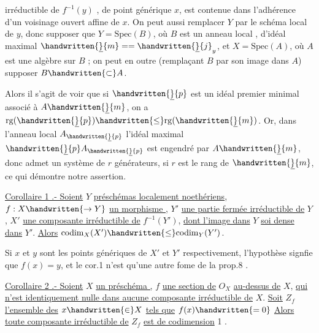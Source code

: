 irréductible de $f^{-1}(y)$ , de point générique $x$, est contenue dans l'adhérence d'un voisinage ouvert affine de $x$. On peut aussi remplacer $Y$ par le schéma local de $y$, donc supposer que  $Y=\mathrm{Spec}(B)$, où $B$ est un anneau local , d'idéal maximal $\handwritten{\underline}{m}==\handwritten{\underline}{j}_y$, et $X=\mathrm{Spec}(A)$, où $A$ est une algèbre   sur $B$ ; on peut en outre (remplaçant $B$ par son image dans $A$) supposer $B\handwritten{\subset} A$.

Alors il s'agit de voir que si $\handwritten{\underline}{p}$ est  un idéal premier minimal associé à $A\handwritten{\underline}{m}$, on a $\mathrm{rg}(\handwritten{\underline}{p})\handwritten{\leq}\mathrm{rg}(\handwritten{\underline}{m})$. Or, dans l'anneau local  $A_{\handwritten{\underline}{p}}$ l'idéal maximal $\handwritten{\underline}{p}A_{\handwritten{\underline}{p}}$ est engendré par $A\handwritten{\underline}{m}$, donc admet un système de $r$ générateurs, si $r$ est le rang de $\handwritten{\underline}{m}$, ce qui démontre notre assertion.

\uline{Corollaire 1 .- Soient}  $Y$ \uline{  préschémas localement noethériens}, $f:X\handwritten{\to Y}$ \uline{un morphisme }, $Y'$ \uline{une partie fermée irréductible de} $Y$, $X'$ \uline{une composante irréductible de} $f^{-1}(Y')$, \uline{dont l'image dans} $Y$ \uline{soi dense dans} $Y'$. \uline{Alors} $\mathrm{codim}_X(X')\handwritten{\leq}\mathrm{codim}_Y(Y')$.

Si $x$ et $y$ sont les points génériques de $X'$ et $Y'$ respectivement,  l'hypothèse signfie que $f(x)=y$, et le cor.1 n'est qu'une autre fome de la prop.8 .

\uline{Corollaire 2 .- Soient} $X$ \uline{un préschéma  ,} $f$ \uline{une section de} $O_X$ \uline{au-dessus de} $X$, \uline{qui n'est identiquement nulle dans aucune composante irréductible de} $X$. \uline{Soit} $Z_f$ \uline{l'ensemble des} $x\handwritten{\in}X$ \uline{tels que} $f(x)\handwritten{=0}$ \uline{Alors toute composante irréductible de} $Z_f$ \uline{est de codimension} 1 .

